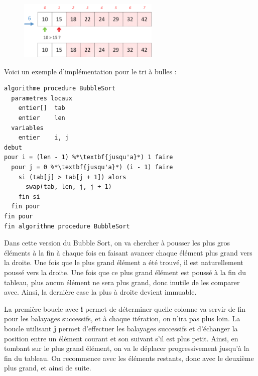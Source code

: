 \documentclass[11pt,a4paper]{article}
\begin{document}
\begin{figure}[ht!]
\centering
\centerline{
\includegraphics[width=0.6\textwidth]{img/tris/2_per_pages/BubbleSort_part4.png}
}
\end{figure}


\bigskip


\clearpage

Voici un exemple d'implémentation pour le tri à bulles :

\bigskip

\begin{table}[ht!]
  \centering
\begin{lstlisting}[style=algorithmique]
algorithme procedure BubbleSort
  parametres locaux
    entier[]  tab
    entier    len
  variables
    entier    i, j
debut
pour i = (len - 1) %*\textbf{jusqu'a}*) 1 faire
  pour j = 0 %*\textbf{jusqu'a}*) (i - 1) faire
    si (tab[j] > tab[j + 1]) alors
      swap(tab, len, j, j + 1)
    fin si
  fin pour
fin pour
fin algorithme procedure BubbleSort \end{lstlisting}
\end{table}


Dans cette version du Bubble Sort, on va chercher à pousser les plus gros éléments à la fin à chaque fois en faisant avancer chaque élément plus grand vers la droite.
Une fois que le plus grand élément a été trouvé, il est naturellement poussé vers la droite.
Une fois que ce plus grand élément est poussé à la fin du tableau, plus aucun élément ne sera plus grand, donc inutile de les comparer avec.
Ainsi, la dernière case la plus à droite devient immuable.

\medskip

La première boucle avec \textbf{i} permet de déterminer quelle colonne va servir de fin pour les balayages successifs, et à chaque itération, on n'ira pas plus loin.
La boucle utilisant \textbf{j} permet d'effectuer les balayages successifs et d'échanger la position entre un élément courant et son suivant s'il est plus petit.
Ainsi, en tombant sur le plus grand élément, on va le déplacer progressivement jusqu'à la fin du tableau.
On recommence avec les éléments restants, donc avec le deuxième plus grand, et ainsi de suite.
\end{document}
